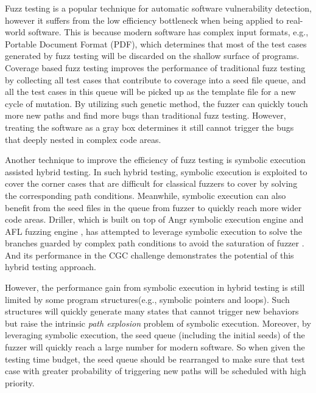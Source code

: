 

Fuzz testing is a popular technique for automatic software vulnerability detection, 
however it suffers from the low efficiency bottleneck when being applied to real-world software. 
This is because modern software has complex input formats, e.g., Portable Document Format (PDF), which determines that most of the test cases generated 
 by fuzz testing will be discarded on the shallow surface of programs. 
 Coverage based fuzz testing improves the performance of traditional fuzz testing 
 by collecting all test cases that contribute to coverage into a seed file queue, 
 and all the test cases in this queue will be picked up as the template file for a new cycle of mutation.
 By utilizing such genetic method, 
 the fuzzer can quickly touch more new paths and find more bugs 
 than traditional fuzz testing. 
 However, treating the software as a gray box determines it still cannot trigger the bugs 
 that deeply nested in complex code areas.  

Another technique to improve the efficiency of fuzz testing is symbolic execution assisted hybrid testing.
 In such hybrid testing, symbolic execution is exploited to cover the corner cases that are difficult for classical fuzzers to cover by solving the corresponding path conditions.
 Meanwhile, symbolic execution can also benefit from the seed files in the queue from fuzzer 
 to quickly reach more wider code areas. 
 Driller, which is built on top of Angr symbolic execution engine \cite{Shoshitaishvili_firmalice-automatic} and AFL fuzzing engine \cite{online:afl}, 
 has attempted to leverage symbolic execution to solve the branches guarded 
 by complex path conditions to avoid the saturation of fuzzer \cite{stephens2016driller}. 
 And its performance in the CGC challenge \cite{online:CGC} demonstrates the potential of this hybrid testing approach.

However, the performance gain from symbolic execution in hybrid testing is still limited 
 by some program structures(e.g., symbolic pointers and loops). 
 Such structures will quickly generate many states that cannot trigger new behaviors 
 but raise the intrinsic \textit{path explosion} problem of symbolic execution.
 Moreover, by leveraging symbolic execution, 
 the seed queue (including the initial seeds) of the fuzzer will quickly reach a large number for modern software. 
 So when given the testing time budget, the seed queue should be rearranged to make sure 
 that test case with greater probability of triggering new paths will be scheduled with high priority.  

